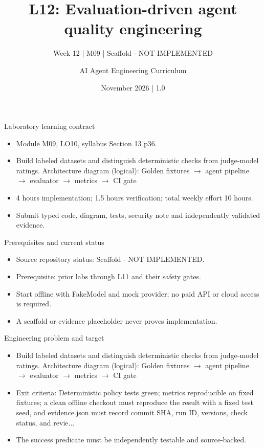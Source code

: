 \documentclass[aspectratio=169,10pt]{beamer}
\title[L12 - Agent Engineering]{L12: Evaluation-driven agent quality engineering}
\subtitle{Week 12 | M09 | Scaffold - NOT IMPLEMENTED}
\author{AI Agent Engineering Curriculum}
\date{November 2026 | 1.0}
\begin{document}
\begin{frame}\titlepage\end{frame}

\begin{frame}{Laboratory learning contract}
\small
\begin{itemize}
\item Module M09, LO10, syllabus Section 13 p36.
\item Build labeled datasets and distinguish deterministic checks from judge-model ratings. Architecture diagram (logical): Golden fixtures $\rightarrow$ agent pipeline $\rightarrow$ evaluator $\rightarrow$ metrics $\rightarrow$ CI gate
\item 4 hours implementation; 1.5 hours verification; total weekly effort 10 hours.
\item Submit typed code, diagram, tests, security note and independently validated evidence.
\end{itemize}

\end{frame}

\begin{frame}{Prerequisites and current status}
\small
\begin{itemize}
\item Source repository status: Scaffold - NOT IMPLEMENTED.
\item Prerequisite: prior labs through L11 and their safety gates.
\item Start offline with FakeModel and mock provider; no paid API or cloud access is required.
\item A scaffold or evidence placeholder never proves implementation.
\end{itemize}

\end{frame}

\begin{frame}{Engineering problem and target}
\small
\begin{itemize}
\item Build labeled datasets and distinguish deterministic checks from judge-model ratings. Architecture diagram (logical): Golden fixtures $\rightarrow$ agent pipeline $\rightarrow$ evaluator $\rightarrow$ metrics $\rightarrow$ CI gate
\item Exit criteria: Deterministic policy tests green; metrics reproducible on fixed fixtures; a clean offline checkout must reproduce the result with a fixed test seed, and evidence.json must record commit SHA, run ID, versions, check status, and revie...
\item The success predicate must be independently testable and source-backed.
\end{itemize}

\end{frame}
\end{document}
